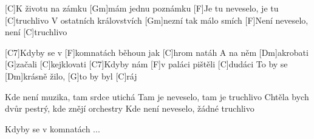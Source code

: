 
[C]K životu na zámku [Gm]mám jednu poznámku 
[F]Je tu neveselo, je tu [C]truchlivo
V ostatních královstvích [Gm]nezní tak málo smích
[F]Není neveselo, není [C]truchlivo

[C7]Kdyby se v [F]komnatách běhoun jak [C]hrom natáh
A na něm [Dm]akrobati [G]začali [C]kejklovati
[C7]Kdyby nám [F]v paláci pištěli [C]dudáci 
To by se [Dm]krásně žilo, [G]to by byl [C]ráj

Kde není muzika, tam srdce utichá
Tam je neveselo, tam je truchlivo
Chtěla bych dvůr pestrý, kde znějí orchestry
Kde není neveselo, žádné truchlivo

Kdyby se v komnatách ... 
